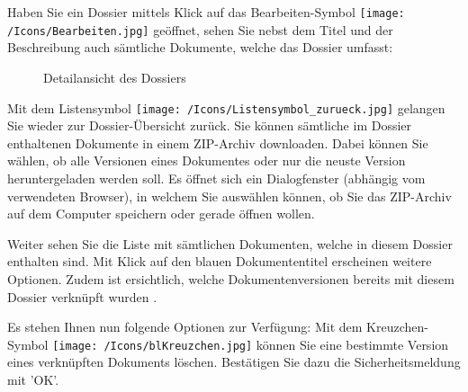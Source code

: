 Haben Sie ein Dossier mittels Klick auf das Bearbeiten-Symbol \texttt{[image: /Icons/Bearbeiten.jpg]}  geöffnet, sehen Sie nebst dem Titel und der Beschreibung auch sämtliche Dokumente, welche das Dossier umfasst:

\begin{figure}[H]
  \vspace{-5pt}
\caption{Detailansicht des Dossiers}
\end{figure}

Mit dem Listensymbol \texttt{[image: /Icons/Listensymbol\_zurueck.jpg]}  gelangen Sie wieder zur Dossier-Übersicht zurück. Sie können sämtliche im Dossier enthaltenen Dokumente in einem ZIP-Archiv downloaden. Dabei können Sie wählen, ob alle Versionen eines Dokumentes oder nur die neuste Version heruntergeladen werden soll.  Es öffnet sich ein Dialogfenster (abhängig vom verwendeten Browser), in welchem Sie auswählen können, ob Sie das ZIP-Archiv auf dem Computer speichern oder gerade öffnen wollen. \newline

Weiter sehen Sie die Liste mit sämtlichen Dokumenten, welche in diesem Dossier enthalten sind. Mit Klick auf den blauen Dokumententitel  erscheinen weitere Optionen. Zudem ist ersichtlich, welche Dokumentenversionen bereits mit diesem Dossier verknüpft wurden . \newline

Es stehen Ihnen nun folgende Optionen zur Verfügung:
Mit dem Kreuzchen-Symbol \texttt{[image: /Icons/blKreuzchen.jpg]}  können Sie eine bestimmte Version eines verknüpften Dokuments löschen. Bestätigen Sie dazu die Sicherheitsmeldung mit 'OK'.

\begin{figure}[H]
\end{figure}

